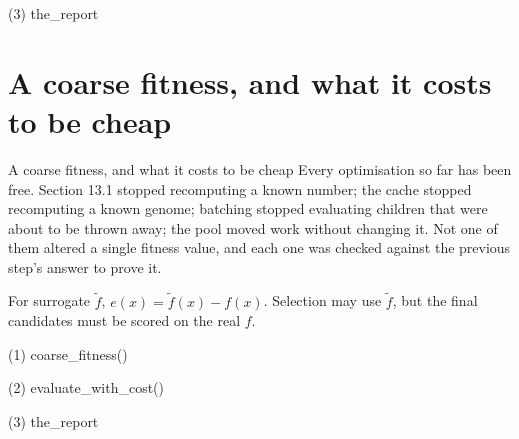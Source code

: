 \begin{frame}[fragile]{(3) the\_report}

\end{frame}


\section{A coarse fitness, and what it costs to be cheap}

\begin{frame}{A coarse fitness, and what it costs to be cheap}
Every optimisation so far has been free. Section 13.1 stopped recomputing a
known number; the cache stopped recomputing a known genome; batching stopped
evaluating children that were about to be thrown away; the pool moved work
without changing it. Not one of them altered a single fitness value, and each
one was checked against the previous step's answer to prove it.

For surrogate \(\tilde f\), \(e(x)=\tilde f(x)-f(x)\). Selection may use
\(\tilde f\), but the final candidates must be scored on the real \(f\).
\end{frame}

\begin{frame}[fragile]{(1) coarse\_fitness()}

\end{frame}

\begin{frame}[fragile]{(2) evaluate\_with\_cost()}

\end{frame}

\begin{frame}[fragile]{(3) the\_report}

\end{frame}

